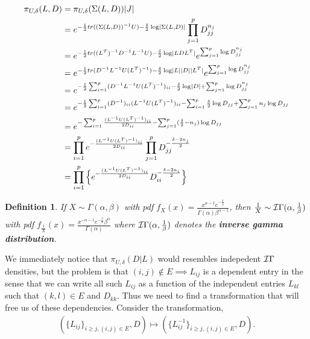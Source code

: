 \documentclass[12pt, leqno]{article}
\providecommand{\abs}[1]{\lvert#1\rvert}
\def\invgamma{\ensuremath \mathcal{I}\Gamma}
\def\s{\ensuremath\Sigma}
\newtheorem{defn}[thm]{Definition}
\begin{document}
\begin{align*}
\pi_{U,\delta}(L,D) &= \pi_{U,\delta}(\s(L,D))\abs{J} \\
&= e^{-\frac{1}{2}tr((\s (L,D))^{-1} U) -
  \frac{\delta}{2} \log \abs{\s(L,D) }} \prod_{j=1}^p D_{jj}^{n_j}\\
&= e^{-\frac{1}{2}tr((L^T)^{-1}D^{-1}L^{-1}U) -
  \frac{\delta}{2} \log \abs{LDL^T}} e^{\sum_{j=1}^p \log
  D_{jj}^{n_j}} \\
&= e^{-\frac{1}{2}tr(D^{-1}L^{-1}U(L^T)^{-1}) -
  \frac{\delta}{2} \log \abs{L}\abs{D}\abs{L^T}} e^{\sum_{j=1}^p \log
  D_{jj}^{n_j}} \\
&= e^{-\frac{1}{2}\sum_{i=1}^p(D^{-1}L^{-1}U(L^T)^{-1})_{ii} -
  \frac{\delta}{2} \log \abs{D}+\sum_{j=1}^p \log D_{jj}^{n_j}}\\
&= e^{-\frac{1}{2} \sum_{i=1}^p(D^{-1})_{ii}(L^{-1} U (L^T)^{-1})_{ii} -
 \sum_{i=1}^p \frac{\delta}{2} \log D_{jj}+\sum_{j=1}^p {n_j} \log
  D_{jj}}\\
&= e^{-\sum_{i=1}^p \frac{(L^{-1} U (L^T)^{-1})_{ii}}{2D_{ii}} -
 \sum_{j=1}^p (\frac{\delta}{2} - {n_j}) \log D_{jj}}\\
&= \prod_{i=1}^p e^{- \frac{(L^{-1} U (L^T)^{-1})_{ii}}{2D_{ii}}}
 \prod_{j=1}^p D_{jj}^{-\frac{\delta-2n_j}{2}}\\
&= \prod_{i=1}^p \Big\{ e^{- \frac{(L^{-1} U (L^T)^{-1})_{ii}}{2D_{ii}}}
 D_{ii}^{-\frac{\delta-2n_i}{2}} \Big\}
\end{align*}
\begin{defn}\label{defn:invgamma}
If $X \sim \Gamma(\alpha,\beta)$ with pdf $f_{X}(x) = \frac{x^{\alpha-1}e^{-\frac{x}{\beta}}}{\Gamma(\alpha)\beta^{\alpha-1}}$, then $\frac{1}{X}
\sim \invgamma (\alpha, \frac{1}{\beta})$ with pdf $f_{\frac{1}{X}}(x)
=
\frac{x^{-\alpha-1}e^{-\frac{\beta}{x}}\beta^{\alpha}}{\Gamma(\alpha)}$
where $\invgamma (\alpha, \frac{1}{\beta})$ denotes the \textbf{inverse gamma
distribution}.
\end{defn}
 We immediately notice that $\pi_{U,\delta}(D|L)$
would resembles indepedent $\invgamma$ densities, but the problem is
that $(i,j) \not\in E \implies L_{ij}$ is a dependent entry in the
sense that we can write all such $L_{ij}$ as a function of the
independent entries $L_{kl}$
such that $(k,l) \in E$ and $D_{kk}$. Thus we need to find a
transformation that will free us of these dependencies. Consider the transformation,
\begin{align*}
(\{L_{ij}\}_{i \geq j,
  (i,j) \in E}, D) \mapsto (\{L_{ij}^{-1
}\}_{i \geq j,
  (i,j) \in E}, D).
\end{align*}
\end{document}
